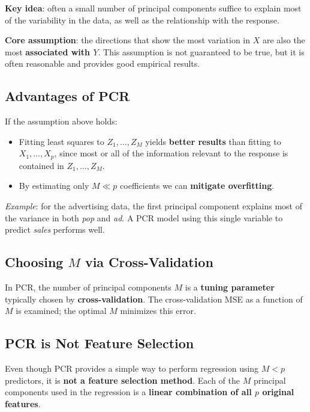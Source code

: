 \documentclass[11pt,a4paper]{article}
\theoremstyle{definition}
\theoremstyle{plain}
\theoremstyle{remark}
\begin{document}
\textbf{Key idea}: often a small number of principal components suffice to explain most of the variability in the data, as well as the relationship with the response.

\textbf{Core assumption}: the directions that show the most variation in $X$ are also the most \textbf{associated with $Y$}. This assumption is not guaranteed to be true, but it is often reasonable and provides good empirical results.

\subsection{Advantages of PCR}

If the assumption above holds:
\begin{itemize}
    \item Fitting least squares to $Z_1, \ldots, Z_M$ yields \textbf{better results} than fitting to $X_1, \ldots, X_p$, since most or all of the information relevant to the response is contained in $Z_1, \ldots, Z_M$.
    \item By estimating only $M \ll p$ coefficients we can \textbf{mitigate overfitting}.
\end{itemize}

\textit{Example}: for the advertising data, the first principal component explains most of the variance in both \textit{pop} and \textit{ad}. A PCR model using this single variable to predict \textit{sales} performs well.

\subsection{Choosing $M$ via Cross-Validation}

In PCR, the number of principal components $M$ is a \textbf{tuning parameter} typically chosen by \textbf{cross-validation}. The cross-validation MSE as a function of $M$ is examined; the optimal $M$ minimizes this error.

\subsection{PCR is Not Feature Selection}

\begin{tcolorbox}[colback=orange!5!white,colframe=orange!75!black,title=\textbf{Important: PCR $\neq$ Feature Selection}]
Even though PCR provides a simple way to perform regression using $M < p$ predictors, it is \textbf{not a feature selection method}. Each of the $M$ principal components used in the regression is a \textbf{linear combination of all $p$ original features}.
\end{tcolorbox}
\end{document}
